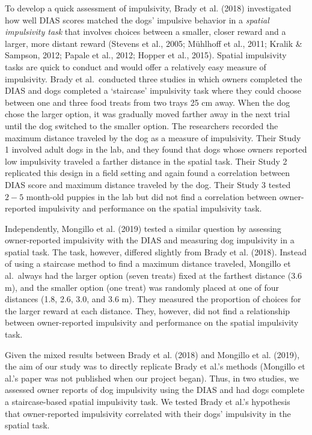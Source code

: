 \documentclass[
  pub,floatsintext]{apa6}
\begin{document}
To develop a quick assessment of impulsivity, Brady et al. (2018) investigated how well DIAS scores matched the dogs' impulsive behavior in a \emph{spatial impulsivity task} that involves choices between a smaller, closer reward and a larger, more distant reward (Stevens et al., 2005; Mühlhoff et al., 2011; Kralik \& Sampson, 2012; Papale et al., 2012; Hopper et al., 2015). Spatial impulsivity tasks are quick to conduct and would offer a relatively easy measure of impulsivity. Brady et al.~conducted three studies in which owners completed the DIAS and dogs completed a `staircase' impulsivity task where they could choose between one and three food treats from two trays 25 cm away. When the dog chose the larger option, it was gradually moved farther away in the next trial until the dog switched to the smaller option. The researchers recorded the maximum distance traveled by the dog as a measure of impulsivity. Their Study 1 involved adult dogs in the lab, and they found that dogs whose owners reported low impulsivity traveled a farther distance in the spatial task. Their Study 2 replicated this design in a field setting and again found a correlation between DIAS score and maximum distance traveled by the dog. Their Study 3 tested \(2-5\) month-old puppies in the lab but did not find a correlation between owner-reported impulsivity and performance on the spatial impulsivity task.

Independently, Mongillo et al. (2019) tested a similar question by assessing owner-reported impulsivity with the DIAS and measuring dog impulsivity in a spatial task. The task, however, differed slightly from Brady et al. (2018). Instead of using a staircase method to find a maximum distance traveled, Mongillo et al.~always had the larger option (seven treats) fixed at the farthest distance (3.6 m), and the smaller option (one treat) was randomly placed at one of four distances (1.8, 2.6, 3.0, and 3.6 m). They measured the proportion of choices for the larger reward at each distance. They, however, did not find a relationship between owner-reported impulsivity and performance on the spatial impulsivity task.

Given the mixed results between Brady et al. (2018) and Mongillo et al. (2019), the aim of our study was to directly replicate Brady et al.'s methods (Mongillo et al.'s paper was not published when our project began). Thus, in two studies, we assessed owner reports of dog impulsivity using the DIAS and had dogs complete a staircase-based spatial impulsivity task. We tested Brady et al.'s hypothesis that owner-reported impulsivity correlated with their dogs' impulsivity in the spatial task.
\end{document}
